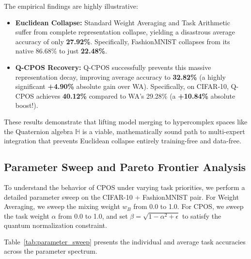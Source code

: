\documentclass{article}
\theoremstyle{plain}
\theoremstyle{definition}
\theoremstyle{remark}
\begin{document}
The empirical findings are highly illustrative:
\begin{itemize}
\item \textbf{Euclidean Collapse:} Standard Weight Averaging and Task Arithmetic suffer from complete representation collapse, yielding a disastrous average accuracy of only \textbf{27.92\%}. Specifically, FashionMNIST collapses from its native 86.68\% to just \textbf{22.48\%}.
\item \textbf{Q-CPOS Recovery:} Q-CPOS successfully prevents this massive representation decay, improving average accuracy to \textbf{32.82\%} (a highly significant \textbf{+4.90\%} absolute gain over WA). Specifically, on CIFAR-10, Q-CPOS achieves \textbf{40.12\%} compared to WA's 29.28\% (a \textbf{+10.84\%} absolute boost!).
\end{itemize}
These results demonstrate that lifting model merging to hypercomplex spaces like the Quaternion algebra $\mathbb{H}$ is a viable, mathematically sound path to multi-expert integration that prevents Euclidean collapse entirely training-free and data-free.

\subsection{Parameter Sweep and Pareto Frontier Analysis}
To understand the behavior of CPOS under varying task priorities, we perform a detailed parameter sweep on the CIFAR-10 + FashionMNIST pair. For Weight Averaging, we sweep the mixing weight $w_B$ from 0.0 to 1.0. For CPOS, we sweep the task weight $\alpha$ from 0.0 to 1.0, and set $\beta = \sqrt{1 - \alpha^2 + \epsilon}$ to satisfy the quantum normalization constraint.

Table~\ref{tab:parameter_sweep} presents the individual and average task accuracies across the parameter spectrum.
\end{document}
